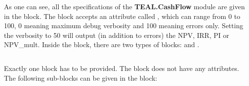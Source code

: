 As one can see, all the specifications of the \textbf{TEAL.CashFlow} module are given in the  block. The block accepts an attribute called ,
which can range from 0 to 100, 0 meaning maximum debug verbosity and 100 meaning
errors only. Setting the verbosity to 50 will output (in addition to errors) the
 NPV, IRR, PI or NPV\_mult. Inside the  block, there are two
 types of blocks:  and .

\subsection{}
Exactly one  block has to be provided. The  block does not have any attributes. The following sub-blocks can be given in the  block:

